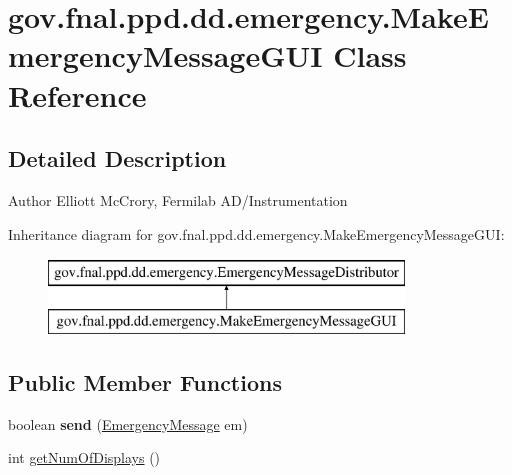 \hypertarget{classgov_1_1fnal_1_1ppd_1_1dd_1_1emergency_1_1MakeEmergencyMessageGUI}{\section{gov.\-fnal.\-ppd.\-dd.\-emergency.\-Make\-Emergency\-Message\-G\-U\-I Class Reference}
\label{classgov_1_1fnal_1_1ppd_1_1dd_1_1emergency_1_1MakeEmergencyMessageGUI}
}


\subsection{Detailed Description}
\begin{DoxyAuthor}{Author}
Elliott Mc\-Crory, Fermilab A\-D/\-Instrumentation 
\end{DoxyAuthor}
Inheritance diagram for gov.\-fnal.\-ppd.\-dd.\-emergency.\-Make\-Emergency\-Message\-G\-U\-I\-:\begin{figure}[H]
\begin{center}
\leavevmode
\includegraphics[height=2.000000cm]{classgov_1_1fnal_1_1ppd_1_1dd_1_1emergency_1_1MakeEmergencyMessageGUI}
\end{center}
\end{figure}
\subsection*{Public Member Functions}
\begin{DoxyCompactItemize}
\item 
\hypertarget{classgov_1_1fnal_1_1ppd_1_1dd_1_1emergency_1_1MakeEmergencyMessageGUI_afb44cf215f0085e5a43f07e493f02f21}{boolean {\bfseries send} (\hyperlink{classgov_1_1fnal_1_1ppd_1_1dd_1_1emergency_1_1EmergencyMessage}{Emergency\-Message} em)}\label{classgov_1_1fnal_1_1ppd_1_1dd_1_1emergency_1_1MakeEmergencyMessageGUI_afb44cf215f0085e5a43f07e493f02f21}

\item 
int \hyperlink{classgov_1_1fnal_1_1ppd_1_1dd_1_1emergency_1_1MakeEmergencyMessageGUI_abfa8df4faa5c546429424e38656d3d16}{get\-Num\-Of\-Displays} ()
\end{DoxyCompactItemize}
